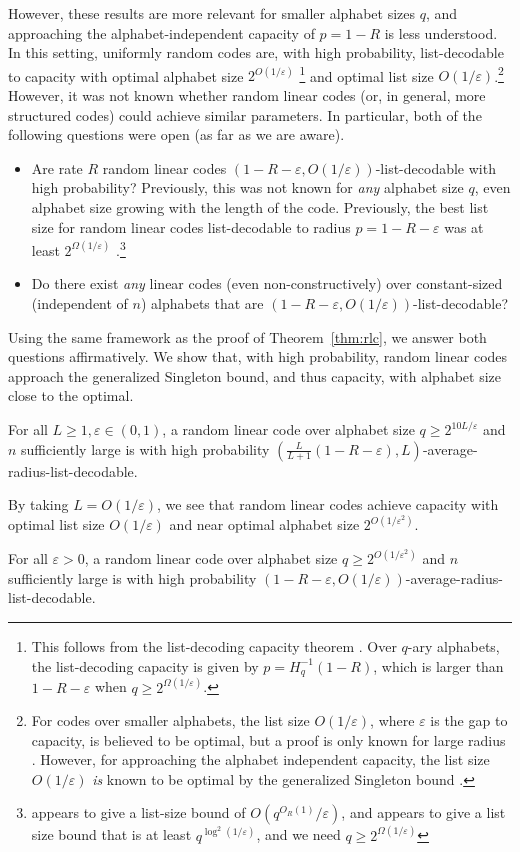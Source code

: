 \documentclass{article}[11pt]
\begin{document}
However, these results are more relevant for smaller alphabet sizes $q$, and approaching the alphabet-independent capacity of $p=1-R$ is less understood.
In this setting, uniformly random codes are, with high probability, list-decodable to capacity with optimal alphabet size $2^{O(1/\varepsilon)}$ \footnote{This follows from the list-decoding capacity theorem \cite{Elias57,Wozencraft58}. Over $q$-ary alphabets, the list-decoding capacity is given by $p=H_q^{-1}(1-R)$, which is larger than $1-R-\varepsilon$ when $q\ge 2^{\Omega(1/\varepsilon)}$.} and optimal list size $O(1/\varepsilon)$.\footnote{For codes over smaller alphabets, the list size $O(1/\varepsilon)$, where $\varepsilon$ is the gap to capacity, is believed to be optimal, but a proof is only known for large radius \cite{GV05}. However, for approaching the alphabet independent capacity, the list size $O(1/\varepsilon)$ \emph{is} known to be optimal by the generalized Singleton bound \cite{ST20}.}
However, it was not known whether random linear codes (or, in general, more structured codes) could achieve similar parameters. In particular, both of the following questions were open (as far as we are aware).
\begin{itemize}
  \item Are rate $R$ random linear codes $(1-R-\varepsilon,O(1/\varepsilon))$-list-decodable with high probability? 
    Previously, this was not known for \emph{any} alphabet size $q$, even alphabet size growing with the length of the code.
    Previously, the best list size for random linear codes list-decodable to radius $p=1-R-\varepsilon$ was at least $2^{\Omega(1/\varepsilon)}$ \cite{GHK11,RudraW18}.\footnote{\cite{GHK11} appears to give a list-size bound of $O(q^{O_R(1)}/\varepsilon)$, and \cite{RudraW18} appears to give a list size bound that is at least $q^{\log^2(1/\varepsilon)}$, and we need $q\ge 2^{\Omega(1/\varepsilon)}$} 
  \item Do there exist \emph{any} linear codes (even non-constructively) over constant-sized (independent of $n$) alphabets that are $(1-R-\varepsilon,O(1/\varepsilon))$-list-decodable?
\end{itemize}
Using the same framework as the proof of Theorem~\ref{thm:rlc}, we answer both questions affirmatively.
We show that, with high probability, random linear codes approach the generalized Singleton bound, and thus capacity, with alphabet size close to the optimal.
\begin{theorem}
  For all $L\ge 1, \varepsilon\in (0,1)$, a random linear code over alphabet size $q\ge 2^{10L/\varepsilon}$ and $n$ sufficiently large is with high probability $(\frac{L}{L+1}(1-R-\varepsilon),L)$-average-radius-list-decodable.
  \label{thm:rlc}
\end{theorem}
By taking $L=O(1/\varepsilon)$, we see that random linear codes achieve capacity with optimal list size $O(1/\varepsilon)$ and near optimal alphabet size $2^{O(1/\varepsilon^2)}$.
\begin{corollary}
  For all $\varepsilon > 0$, a random linear code over alphabet size $q\ge 2^{O(1/\varepsilon^2)}$ and $n$ sufficiently large is with high probability $(1-R-\varepsilon,O(1/\varepsilon))$-average-radius-list-decodable.
  \label{cor:rlc}
\end{corollary}
\end{document}
